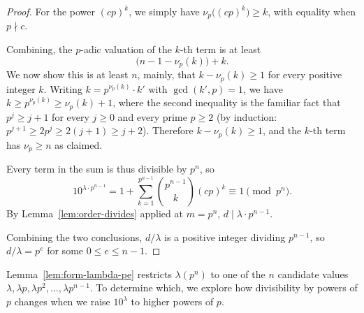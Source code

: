 \documentclass[12pt]{amsart}
\theoremstyle{definition}
\theoremstyle{remark}
\begin{document}
\begin{proof}
For the power $(cp)^k$, we simply have $\nu_p\!\bigl((cp)^k\bigr) \ge 
k$, with equality when $p \nmid c$.

Combining, the $p$-adic valuation of the $k$-th term is at least
\[
  \bigl(n - 1 - \nu_p(k)\bigr) + k.
\]
We now show this is at least $n$, mainly, that $k - \nu_p(k) \ge 1$ for 
every positive integer $k$. Writing $k = p^{\nu_p(k)} \cdot k'$ with 
$\gcd(k', p) = 1$, we have $k \ge p^{\nu_p(k)} \ge \nu_p(k) + 1$, where 
the second inequality is the familiar fact that $p^j \ge j + 1$ for 
every $j \ge 0$ and every prime $p \ge 2$ (by induction: $p^{j+1} \ge 
2 p^j \ge 2(j + 1) \ge j + 2$). Therefore $k - \nu_p(k) \ge 1$, and 
the $k$-th term has $\nu_p \ge n$ as claimed.

Every term in the sum is thus divisible by $p^n$, so
\[
  10^{\lambda \cdot p^{n-1}} = 1 + \sum_{k=1}^{p^{n-1}} 
  \binom{p^{n-1}}{k}(cp)^k \equiv 1 \pmod{p^n}.
\]
By Lemma~\ref{lem:order-divides} applied at $m = p^n$, 
$d \mid \lambda \cdot p^{n-1}$.


\smallskip

Combining the two conclusions, $d / \lambda$ is a positive integer 
dividing $p^{n-1}$, so $d / \lambda = p^e$ for some $0 \le e \le n - 1$.
\end{proof}

Lemma~\ref{lem:form-lambda-pe} restricts $\lambda(p^n)$ to one of the 
$n$ candidate values $\lambda, \lambda p, \lambda p^2, \ldots, 
\lambda p^{n-1}$. To determine which, we explore
how divisibility by powers of $p$ changes when we raise $10^\lambda$ 
to higher powers of $p$.
\end{document}

